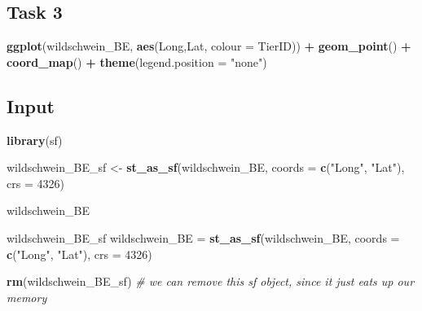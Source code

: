 \documentclass[]{book}
\newenvironment{Shaded}{\begin{snugshade}}{\end{snugshade}}
\newcommand{\KeywordTok}[1]{\textcolor[rgb]{0.13,0.29,0.53}{\textbf{#1}}}
\newcommand{\DataTypeTok}[1]{\textcolor[rgb]{0.13,0.29,0.53}{#1}}
\newcommand{\DecValTok}[1]{\textcolor[rgb]{0.00,0.00,0.81}{#1}}
\newcommand{\StringTok}[1]{\textcolor[rgb]{0.31,0.60,0.02}{#1}}
\newcommand{\CommentTok}[1]{\textcolor[rgb]{0.56,0.35,0.01}{\textit{#1}}}
\newcommand{\OperatorTok}[1]{\textcolor[rgb]{0.81,0.36,0.00}{\textbf{#1}}}
\newcommand{\NormalTok}[1]{#1}
\begin{document}
\begin{Shaded}
\end{Shaded}

\subsection{Task 3}\label{task-3}

\begin{Shaded}
\begin{Highlighting}[]
\KeywordTok{ggplot}\NormalTok{(wildschwein_BE, }\KeywordTok{aes}\NormalTok{(Long,Lat, }\DataTypeTok{colour =}\NormalTok{ TierID)) }\OperatorTok{+}
\StringTok{  }\KeywordTok{geom_point}\NormalTok{() }\OperatorTok{+}
\StringTok{  }\KeywordTok{coord_map}\NormalTok{() }\OperatorTok{+}
\StringTok{  }\KeywordTok{theme}\NormalTok{(}\DataTypeTok{legend.position =} \StringTok{"none"}\NormalTok{)}
\end{Highlighting}
\end{Shaded}

\subsection{Input}\label{input}

\begin{Shaded}
\begin{Highlighting}[]
\KeywordTok{library}\NormalTok{(sf)}

\NormalTok{wildschwein_BE_sf <-}\StringTok{ }\KeywordTok{st_as_sf}\NormalTok{(wildschwein_BE, }\DataTypeTok{coords =} \KeywordTok{c}\NormalTok{(}\StringTok{"Long"}\NormalTok{, }\StringTok{"Lat"}\NormalTok{), }\DataTypeTok{crs =} \DecValTok{4326}\NormalTok{)}

\NormalTok{wildschwein_BE}

\NormalTok{wildschwein_BE_sf}
\NormalTok{wildschwein_BE =}\StringTok{ }\KeywordTok{st_as_sf}\NormalTok{(wildschwein_BE, }\DataTypeTok{coords =} \KeywordTok{c}\NormalTok{(}\StringTok{"Long"}\NormalTok{, }\StringTok{"Lat"}\NormalTok{), }\DataTypeTok{crs =} \DecValTok{4326}\NormalTok{)}

\KeywordTok{rm}\NormalTok{(wildschwein_BE_sf) }\CommentTok{# we can remove this sf object, since it just eats up our memory}
\end{Highlighting}
\end{Shaded}
\end{document}
